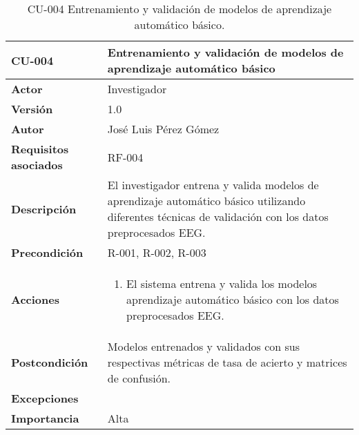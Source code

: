 \begin{table}[p]
	\centering
	\begin{tabularx}{\linewidth}{ p{} p{} }
		\toprule
		\textbf{CU-004}    & \textbf{Entrenamiento y validación de modelos de aprendizaje automático básico}\\
		\toprule
		\textbf{Actor}              & Investigador    \\ 
		\textbf{Versión}              & 1.0    \\
		\textbf{Autor}                & José Luis Pérez Gómez \\
		\textbf{Requisitos asociados} & RF-004 \\
		\textbf{Descripción}          & El investigador entrena y valida modelos de aprendizaje automático básico utilizando diferentes técnicas de validación con los datos preprocesados EEG. \\
		\textbf{Precondición}         & R-001, R-002, R-003\\
		\textbf{Acciones}             &
		\begin{enumerate}
			\def\labelenumi{\arabic{enumi}.}
			\tightlist
			\item El sistema entrena y valida los modelos aprendizaje automático básico con los datos preprocesados EEG.
		\end{enumerate}\\
		\textbf{Postcondición}        & Modelos entrenados y validados con sus respectivas métricas de tasa de acierto y matrices de confusión.\\
		\textbf{Excepciones}          &  \\
		\textbf{Importancia}          & Alta \\
		\bottomrule
	\end{tabularx}
	\caption{CU-004 Entrenamiento y validación de modelos de aprendizaje automático básico.}
\end{table}

